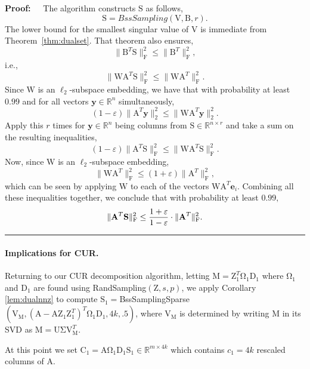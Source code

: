 \documentclass[11pt]{article}
\newcommand{\FNormS}[1]{\mbox{}\|#1\|_\mathrm{F}^2}
\newcommand{\TNormS}[1]{\mbox{}\|#1\|_2^2}
\newenvironment{proof}{\begin{trivlist} \item {\bf Proof:~~}}
  {\qed\end{trivlist}}
\newcommand{\mat}[1]{{\ensuremath{\bm{\mathrm{#1}}}}}
\def\e{{\mathbf e}}
\def\matA{\mat{A}}
\def\matB{\mat{B}}
\def\matC{\mat{C}}
\def\matD{\mat{D}}
\def\matM{\mat{M}}
\def\matS{\mat{S}}
\def\matU{\mat{U}}
\def\matV{\mat{V}}
\def\matW{\mat{W}}
\def\matZ{\mat{Z}}
\def\matOmega{\mat{\Omega}}
\def\matOmega{\mat{\Omega}}
\def\frac#1#2{{#1\over #2}}
\def\qed{\hfill\rule{2mm}{2mm}}
\def\y{{\mathbf y}}
\begin{document}
\begin{proof}
The algorithm constructs $\matS$ as follows,
$$ \matS = BssSampling(\matV, \matB, r). $$
The lower bound for the smallest singular value of $\matV$ is immediate from Theorem~\ref{thm:dualset}. That theorem also ensures,
$$
\FNormS{ \matB^T \matS } \le \FNormS{\matB^T}, 
$$ 
i.e.,
$$
\FNormS{ \matW \matA^T \matS } \le \FNormS{\matW \matA^T}.
$$
Since $\matW$ is an $\ell_2$-subspace embedding, we have that with probability at least $0.99$ 
and for all vectors $\y \in \mathbb{R}^{n}$ simultaneously,
$$
\left( 1 - \varepsilon \right) \TNormS{\matA^T\y} \le \TNormS{\matW \matA^T \y}.
$$
Apply this $r$ times for $\y \in \mathbb{R}^n$ being columns from $\matS \in \mathbb{R}^{n \times r}$ 
and take a sum on the resulting inequalities,
$$\left( 1 - \varepsilon \right) \FNormS{\matA^T \matS} \le \FNormS{\matW \matA^T \matS}.$$
Now, since $\matW$ is an $\ell_2$-subspace embedding, 
$$ \FNormS{\matW \matA^T} \le  \left( 1 + \varepsilon \right)   \FNormS{\matA^T}, $$
which can be seen by applying $\matW$ to each of the vectors $\matW\matA^T\e_i$. 
Combining all these inequalities together, we conclude that with probability at least $0.99,$
$$ \FNormS{\matA^T \matS}  \le \frac{1 + \varepsilon }{1 - \varepsilon} \cdot \FNormS{\matA^T}. $$
\end{proof}

\paragraph{Implications for CUR.} 
Returning to our CUR decomposition algorithm, letting $\matM = \matZ_1^T \mat\Omega_1\matD_1$ where
$\mat\Omega_1$ and $\matD_1$ are found using {\textsc RandSampling}$(\matZ, s, p)$, we apply 
Corollary \ref{lem:dualnnz} to compute 
$\matS_1 = ${\textsc BssSamplingSparse}$(\matV_{\matM},  (\matA-\matA\matZ_1\matZ_1^T)^T \mat\Omega_1\matD_1, 4k, .5)$,
where $\matV_{\matM}$ is determined by writing $\matM$ in its SVD as $\matM = \matU \mat\Sigma \matV_{\matM}^T$. 

At this point we set $\matC_1 = \matA\matOmega_1\matD_1\matS_1 \in \mathbb{R}^{m \times 4k}$ which contains 
$c_1 = 4k$ rescaled columns of $\matA$. 
\end{document}
